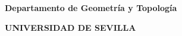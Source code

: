 \documentclass[twoside]{report}
\begin{document}
\begin{center}
{\large \bf Departamento de Geometría y Topología}
\end{center}
\begin{center}
{\large \bf UNIVERSIDAD DE SEVILLA}
\end{center}

\setcounter{page}{0}

\tableofcontents













\end{document}
